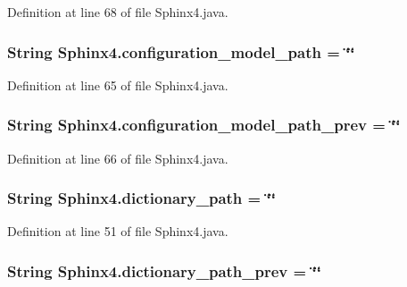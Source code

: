 Definition at line 68 of file Sphinx4.\-java.

\hypertarget{classSphinx4_aa403d02afb54d7c774c4ec53770a567c}{
\subsubsection[{configuration\-\_\-model\-\_\-path}]{\setlength{\rightskip}{0pt plus 5cm}String Sphinx4.\-configuration\-\_\-model\-\_\-path = \char`\"{}\char`\"{}\hspace{0.3cm}{\ttfamily [static]}}}\label{classSphinx4_aa403d02afb54d7c774c4ec53770a567c}


Definition at line 65 of file Sphinx4.\-java.

\hypertarget{classSphinx4_aaa4c30258a2c98605fc05ab3e50c20ca}{
\subsubsection[{configuration\-\_\-model\-\_\-path\-\_\-prev}]{\setlength{\rightskip}{0pt plus 5cm}String Sphinx4.\-configuration\-\_\-model\-\_\-path\-\_\-prev = \char`\"{}\char`\"{}\hspace{0.3cm}{\ttfamily [static]}}}\label{classSphinx4_aaa4c30258a2c98605fc05ab3e50c20ca}


Definition at line 66 of file Sphinx4.\-java.

\hypertarget{classSphinx4_a1c5ef308a94ee2d15c6856c676206ba4}{
\subsubsection[{dictionary\-\_\-path}]{\setlength{\rightskip}{0pt plus 5cm}String Sphinx4.\-dictionary\-\_\-path = \char`\"{}\char`\"{}\hspace{0.3cm}{\ttfamily [static]}}}\label{classSphinx4_a1c5ef308a94ee2d15c6856c676206ba4}


Definition at line 51 of file Sphinx4.\-java.

\hypertarget{classSphinx4_a3c079ed40372dcc0cda65345cda22325}{
\subsubsection[{dictionary\-\_\-path\-\_\-prev}]{\setlength{\rightskip}{0pt plus 5cm}String Sphinx4.\-dictionary\-\_\-path\-\_\-prev = \char`\"{}\char`\"{}\hspace{0.3cm}{\ttfamily [static]}}}\label{classSphinx4_a3c079ed40372dcc0cda65345cda22325}


